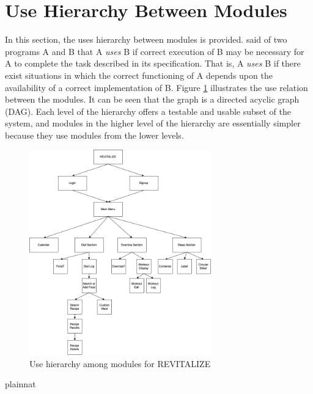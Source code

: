 \documentclass[12pt, titlepage]{article}
\begin{document}
\section{Use Hierarchy Between Modules} \label{SecUse}

In this section, the uses hierarchy between modules is
provided. \citet{Parnas1978} said of two programs A and B that A {\em uses} B if
correct execution of B may be necessary for A to complete the task described in
its specification. That is, A {\em uses} B if there exist situations in which
the correct functioning of A depends upon the availability of a correct
implementation of B.  Figure \ref{FigUH} illustrates the use relation between
the modules. It can be seen that the graph is a directed acyclic graph
(DAG). Each level of the hierarchy offers a testable and usable subset of the
system, and modules in the higher level of the hierarchy are essentially simpler
because they use modules from the lower levels.

\begin{figure}[H]
	\centering
	\includegraphics[width=0.7\textwidth]{images/MGDAG.png}
	\caption{Use hierarchy among modules for REVITALIZE}
	\label{FigUH}
\end{figure}


 {plainnat}


\newpage{}
\end{document}
